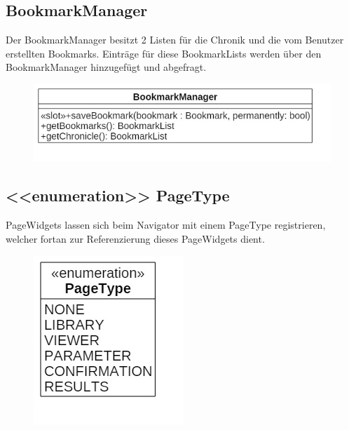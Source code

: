 \subsection*{BookmarkManager}
Der BookmarkManager besitzt 2 Listen für die Chronik und die vom Benutzer erstellten Bookmarks. Einträge für diese BookmarkLists werden über den BookmarkManager hinzugefügt und abgefragt.

\begin{figure}[H]
\centering
\includegraphics[scale=0.5]{img/Klassendiagramm/Klassen/Controller/BookmarkManager}
\label{fig:bookmarkManager}
\end{figure}

\subsection*{<<enumeration>> PageType}
PageWidgets lassen sich beim Navigator mit einem PageType registrieren, welcher fortan zur Referenzierung dieses PageWidgets dient.

\begin{figure}[H]
\centering
\includegraphics[scale=0.5]{img/Klassendiagramm/Klassen/Controller/PageType}
\label{fig:pageType}
\end{figure}